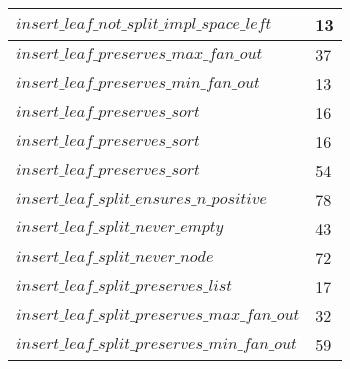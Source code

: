 \begin{tabular}{| l | l |}
$insert\_leaf\_not\_split\_impl\_space\_left$ & 13 \\ \hline
$insert\_leaf\_preserves\_max\_fan\_out$ & 37 \\ \hline
$insert\_leaf\_preserves\_min\_fan\_out$ & 13 \\ \hline
$insert\_leaf\_preserves\_sort$ & 16 \\ \hline
$insert\_leaf\_preserves\_sort$ & 16 \\ \hline
$insert\_leaf\_preserves\_sort$ & 54 \\ \hline
$insert\_leaf\_split\_ensures\_n\_positive$ & 78 \\ \hline
$insert\_leaf\_split\_never\_empty$ & 43 \\ \hline
$insert\_leaf\_split\_never\_node$ & 72 \\ \hline
$insert\_leaf\_split\_preserves\_list$ & 17 \\ \hline
$insert\_leaf\_split\_preserves\_max\_fan\_out$ & 32 \\ \hline
$insert\_leaf\_split\_preserves\_min\_fan\_out$ & 59 \\ \hline
\end{tabular}
\newpage
